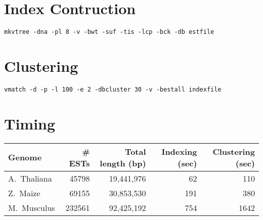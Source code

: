 \documentclass[12pt]{article}
\begin{document}
\section{Index Contruction}
\begin{verbatim}
mkvtree -dna -pl 8 -v -bwt -suf -tis -lcp -bck -db estfile
\end{verbatim}

\section{Clustering}
\begin{verbatim}
vmatch -d -p -l 100 -e 2 -dbcluster 30 -v -bestall indexfile
\end{verbatim}

\section{Timing}

\begin{tabular}{|l|r|r|r|r|}\hline
Genome      &\# ESTs &Total length (bp)&Indexing (sec)&Clustering (sec)\\\hline\hline
A.\ Thaliana&45798   &19,441,976& 62&110\\
Z.\ Maize   &69155   &30,853,530&191&380\\
M.\ Musculus&232561  &92,425,192&754&1642\\\hline
\end{tabular}
\end{document}
